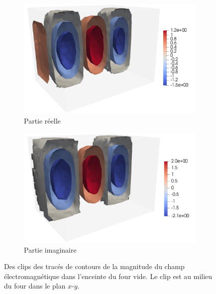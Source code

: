 \begin{figure}[H]
    \centering
    \begin{subfigure}{.5\textwidth}
        \centering
        \includegraphics[scale=0.15]{figures/helmholtz/helmholtz_reel_vide3.png}
        \caption{Partie réelle}
    \end{subfigure}%
    \begin{subfigure}{.5\textwidth}
        \centering
        \includegraphics[scale=0.15]{figures/helmholtz/helmholtz_imag_vide3.png}
        \caption{Partie imaginaire}
    \end{subfigure}
    \caption{Des clips des tracés de contours de la magnitude du champ
    électromagnétique dans l'enceinte du four vide. Le clip est au milieu du
    four dans le plan $x\text{-}y$.}
\end{figure}


